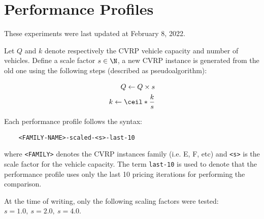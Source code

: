 \chapter{Performance Profiles}
These experiments were last updated at February 8, 2022.

Let $Q$ and $k$ denote respectively the CVRP vehicle capacity and number of vehicles.
Define a scale factor $s \in \N$, a new CVRP instance is generated from the old one using the following steps (described as pseudoalgorithm):

\begin{align}
	Q \gets Q \times s \\
	k \gets \ceil*{\frac{k}{s}}
\end{align}

Each performance profile follows the syntax:

\begin{verbatim}
	<FAMILY-NAME>-scaled-<s>-last-10
\end{verbatim}

where \texttt{<FAMILY>} denotes the CVRP instances family (i.e. E, F, etc) and \texttt{<s>} is the scale factor for the vehicle capacity.
The term \texttt{last-10} is used to denote that the performance profile uses only the last 10 pricing iterations for performing the comparison.


At the time of writing, only the following scaling factors were tested: $s = 1.0,\ s = 2.0,\ s = 4.0$.

\newcommand{\IncludePerfProf}[1]{
	\begin{figure}[ht]
		\centering
		\begin{subfigure}{0.5\textwidth}
			\centering
			\texttt{[image: \#1/Time Ratio Plot.pdf]}
		\end{subfigure}%
		\begin{subfigure}{0.5\textwidth}
			\centering
			\texttt{[image: \#1/Relative Cost Plot.pdf]}
		\end{subfigure}%
	\end{figure}
}


